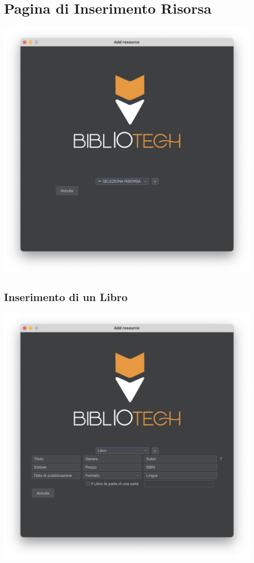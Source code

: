 \section{Pagina di Inserimento Risorsa}
\includegraphics[scale=0.45]{Immagini/Schermate/Insert/InserisciRisorsaPage.png}

\subsection{Inserimento di un Libro}
\includegraphics[scale=0.45]{Immagini/Schermate/Insert/InserisciRisorsaPage-Libro.png}
